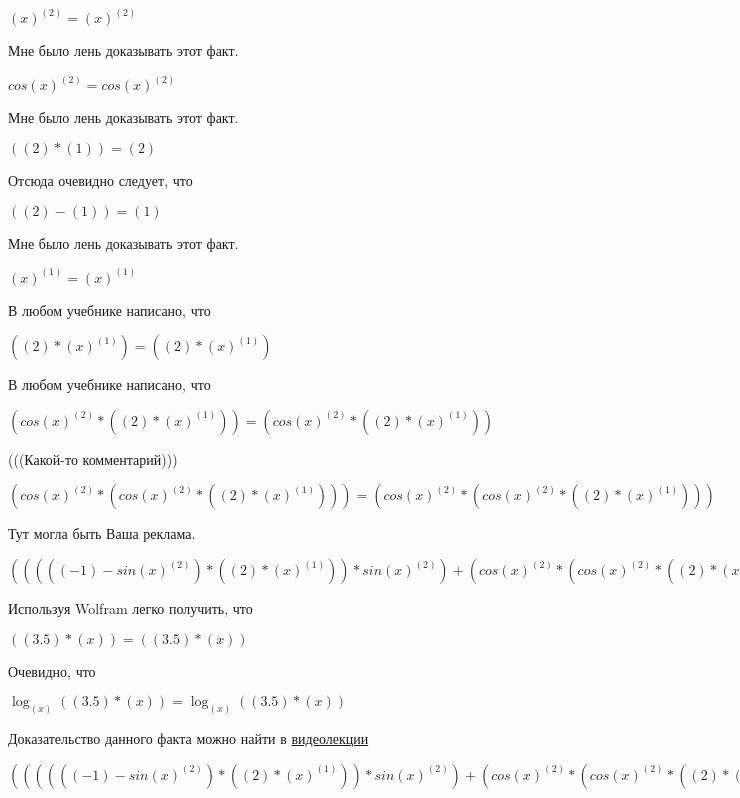 \documentclass[12pt,a4paper,fleqn]{article}
\theoremstyle{definition}
\begin{document}
${( x )}^{( 2 )} = {( x )}^{( 2 )}$

Мне было лень доказывать этот факт.

$cos{( x )}^{( 2 )} = cos{( x )}^{( 2 )}$

Мне было лень доказывать этот факт.

$(( 2 ) * ( 1 )) = ( 2 )$

Отсюда очевидно следует, что

$(( 2 ) - ( 1 )) = ( 1 )$

Мне было лень доказывать этот факт.

${( x )}^{( 1 )} = {( x )}^{( 1 )}$

В любом учебнике написано, что

$(( 2 ) * {( x )}^{( 1 )}) = (( 2 ) * {( x )}^{( 1 )})$

В любом учебнике написано, что

$(cos{( x )}^{( 2 )} * (( 2 ) * {( x )}^{( 1 )})) = (cos{( x )}^{( 2 )} * (( 2 ) * {( x )}^{( 1 )}))$

(((Какой-то комментарий)))

$(cos{( x )}^{( 2 )} * (cos{( x )}^{( 2 )} * (( 2 ) * {( x )}^{( 1 )}))) = (cos{( x )}^{( 2 )} * (cos{( x )}^{( 2 )} * (( 2 ) * {( x )}^{( 1 )})))$

Тут могла быть Ваша реклама.

$((((( -1 ) - sin{( x )}^{( 2 )}) * (( 2 ) * {( x )}^{( 1 )})) * sin{( x )}^{( 2 )}) + (cos{( x )}^{( 2 )} * (cos{( x )}^{( 2 )} * (( 2 ) * {( x )}^{( 1 )})))) = ((((( -1 ) - sin{( x )}^{( 2 )}) * (( 2 ) * {( x )}^{( 1 )})) * sin{( x )}^{( 2 )}) + (cos{( x )}^{( 2 )} * (cos{( x )}^{( 2 )} * (( 2 ) * {( x )}^{( 1 )}))))$

Используя Wolfram легко получить, что

$(( 3.5 ) * ( x )) = (( 3.5 ) * ( x ))$

Очевидно, что

$\log_{( x )}{(( 3.5 ) * ( x ))} = \log_{( x )}{(( 3.5 ) * ( x ))}$

Доказательство данного факта можно найти в \href{https://www.youtube.com/watch?v=dQw4w9WgXcQ}{видеолекции}

$(((((( -1 ) - sin{( x )}^{( 2 )}) * (( 2 ) * {( x )}^{( 1 )})) * sin{( x )}^{( 2 )}) + (cos{( x )}^{( 2 )} * (cos{( x )}^{( 2 )} * (( 2 ) * {( x )}^{( 1 )})))) * \log_{( x )}{(( 3.5 ) * ( x ))}) = (((((( -1 ) - sin{( x )}^{( 2 )}) * (( 2 ) * {( x )}^{( 1 )})) * sin{( x )}^{( 2 )}) + (cos{( x )}^{( 2 )} * (cos{( x )}^{( 2 )} * (( 2 ) * {( x )}^{( 1 )})))) * \log_{( x )}{(( 3.5 ) * ( x ))})$
\end{document}
